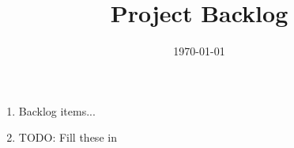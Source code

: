 \documentclass[12pt]{article}
\title{Project Backlog}
\date{\today}
\begin{document}
\maketitle

\begin{enumerate}
\item Backlog items...
\item TODO: Fill these in
\end{enumerate}
\end{document}
